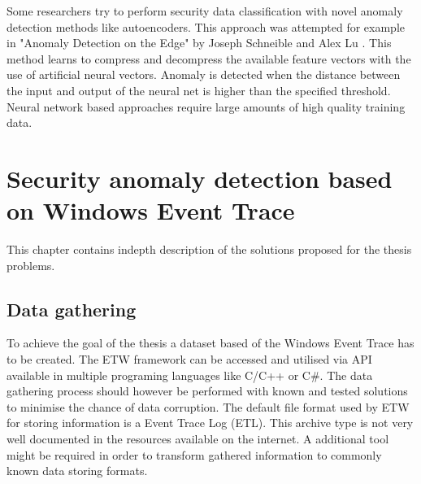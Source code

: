 \documentclass[a4paper,twoside,12pt]{book}
\begin{document}
Some researchers try to perform security
data classification with novel anomaly detection methods like autoencoders. This approach was
attempted for example in "Anomaly Detection on the Edge" by Joseph Schneible and Alex Lu
\cite{bib:autoencoderDist}. This method learns to compress and decompress the available feature 
vectors with the use of artificial neural vectors. Anomaly is detected when the distance 
between the input and output of the neural net is higher than the specified threshold.
Neural network based approaches require large amounts of high quality training data.  




\chapter{Security anomaly detection based on Windows Event Trace}

This chapter contains indepth description of the solutions proposed for the thesis problems. 

\section{Data gathering}
To achieve the goal of the thesis a dataset based of the Windows Event Trace has to 
be created. The ETW framework can be accessed and utilised via API available in multiple
programing languages like C/C++\cite{bib:etwcpp} or C\#\cite{bib:etwcsharp}. The 
data gathering process should however be performed with known and tested solutions to
minimise the chance of data corruption. The default file format used by ETW for storing 
information is a Event Trace Log (ETL). This archive type is not very well documented in 
the resources available on the internet. A additional tool might be required in order to 
transform gathered information to commonly known data storing formats.
\end{document}
